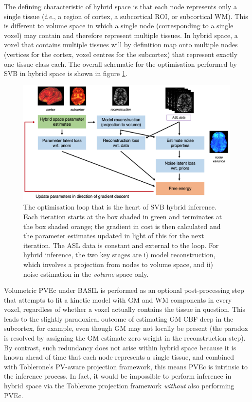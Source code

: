 \documentclass[12pt]{report}
\begin{document}
The defining characteristic of hybrid space is that each node represents only a single tissue (\textit{i.e.}, a region of cortex, a subcortical ROI, or subcortical WM). This is different to volume space in which a single node (corresponding to a single voxel) may contain and therefore represent multiple tissues. In hybrid space, a voxel that contains multiple tissues will by definition map onto multiple nodes (vertices for the cortex, voxel centres for the subcortex) that represent exactly one tissue class each. The overall schematic for the optimisation performed by SVB in hybrid space is shown in figure \ref{svb_schematic}.

\begin{figure}
\centering
\includegraphics[width=\textwidth]{svb_schematic.png}
\caption{The optimisation loop that is the heart of SVB hybrid inference. Each iteration starts at the box shaded in green and terminates at the box shaded orange; the gradient in cost is then calculated and the parameter estimates updated in light of this for the next iteration. The ASL data is constant and external to the loop. For hybrid inference, the two key stages are i) model reconstruction, which involves a projection from nodes to volume space, and ii) noise estimation in the \textit{volume} space only.}
\label{svb_schematic} 
\end{figure}

Volumetric PVEc under BASIL is performed as an optional post-processing step that attempts to fit a kinetic model with GM and WM components in every voxel, regardless of whether a voxel actually contains the tissue in question. This leads to the slightly paradoxical outcome of estimating GM CBF deep in the subcortex, for example, even though GM may not locally be present (the paradox is resolved by assigning the GM estimate zero weight in the reconstruction step). By contrast, such redundancy does not arise within hybrid space because it is known ahead of time that each node represents a single tissue, and combined with Toblerone's PV-aware projection framework, this means PVEc is intrinsic to the inference process. In fact, it would be impossible to perform inference in hybrid space via the Toblerone projection framework \textit{without} also performing PVEc.
\end{document}
